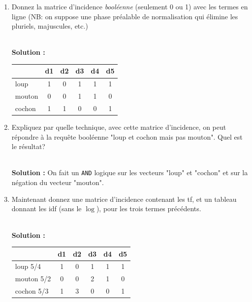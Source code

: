 \documentclass[11pt,a4paper]{article}
\newenvironment{solution}[0]{
~\\ \color{red} \textbf{Solution : }\color{black}}{%
}
\begin{document}
\begin{enumerate}
  \item Donnez la matrice d'incidence \emph{booléenne} (seulement 0 ou 1)
      avec les termes en ligne (NB: on suppose
     une phase préalable de normalisation qui élimine les pluriels, majuscules, etc.)

\begin{solution}
\begin{center}
\begin{tabular}{l|c|c|c|c|c}
           & \textbf{d1} & \textbf{d2} & \textbf{d3} &\textbf{d4}&\textbf{d5} \\ \hline  
   loup    & 1           & 0           & 1           & 1         & 1\\
   mouton  & 0           & 0           & 1           & 1         & 0\\
   cochon  & 1           & 1           & 0           & 0         & 1\\\hline
   \end{tabular}
\end{center}
\end{solution}
    
  \item Expliquez par quelle technique, avec cette matrice d'incidence, on peut 
     répondre à la requête booléenne "loup et cochon mais pas mouton".
     Quel est le résultat?
     
\begin{solution}
On fait un \texttt{AND} logique sur les vecteurs "loup" et "cochon"
et sur la négation du vecteur "mouton".
\end{solution}

   \item Maintenant donnez une matrice d'incidence contenant les tf, 
      et un tableau donnant les idf (sans le $\log$), pour les trois termes précédents.

\begin{solution}
\begin{center}
\begin{tabular}{l|c|c|c|c|c}
            & \textbf{d1} & \textbf{d2} & \textbf{d3} &\textbf{d4}&\textbf{d5} \\ \hline  
   loup  5/4   & 1           & 0           & 1           & 1         & 1\\
   mouton 5/2  & 0           & 0           & 2           & 1         & 0\\
   cochon 5/3  & 1           & 3           & 0           & 0         & 1\\\hline
   \end{tabular}
\end{center}
\end{solution}


\end{enumerate}
\end{document}
